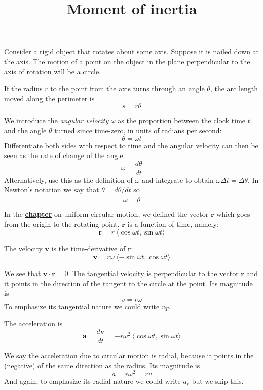 \documentclass[11pt, oneside]{article}
\title{Moment of inertia}
\date{}
\begin{document}
\maketitle
\Large


Consider a rigid object that rotates about some axis.  Suppose it is nailed down at the axis.  The motion of a point on the object in the plane perpendicular to the axis of rotation will be a circle.

If the radius $r$ to the point from the axis turns through an angle $\theta$, the arc length moved along the perimeter is
\[ s = r \theta \]

We introduce the \emph{angular velocity} $\omega$ as the proportion between the clock time $t$ and the angle $\theta$ turned since time-zero, in units of radians per second:
\[ \theta = \omega t \]
Differentiate both sides with respect to time and the angular velocity can then be seen as the rate of change of the angle
\[ \omega = \frac{d \theta}{dt} \]
Alternatively, use this as the definition of $\omega$ and integrate to obtain $\omega \Delta t = \Delta \theta$.
In Newton's notation we say that $\dot{\theta} = d \theta/dt$ so
\[ \omega = \dot{\theta} \]

In the \hyperref[sec:Uniform_circular_motion]{\textbf{chapter}} on uniform circular motion, we defined the vector $\mathbf{r}$ which goes from the origin to the rotating point.  $\mathbf{r}$ is a function of time, namely:
\[ \mathbf{r} = r \ \langle \cos \omega t, \sin \omega t \rangle \]

The velocity $\mathbf{v}$ is the time-derivative of $\mathbf{r}$:
\[ \mathbf{v} = r \omega \ \langle -\sin \omega t, \cos \omega t \rangle \]

We see that $\mathbf{v} \cdot \mathbf{r} = 0$.  The tangential velocity is perpendicular to the vector $\mathbf{r}$ and it points in the direction of the tangent to the circle at the point.  Its magnitude is
\[ v = r \omega \]
To emphasize its tangential nature we could write $v_T$.

The acceleration is
\[ \mathbf{a} = \frac{d \mathbf{v}}{dt} = -r\omega^2 \ \langle \cos \omega t, \sin \omega t \rangle \]

We say the acceleration due to circular motion is radial, because it points in the (negative) of the same direction as the radius.  Its magnitude is
\[ a = r \omega^2 = r v \]
And again, to emphasize its radial nature we could write $a_r$ but we skip this.
\end{document}
